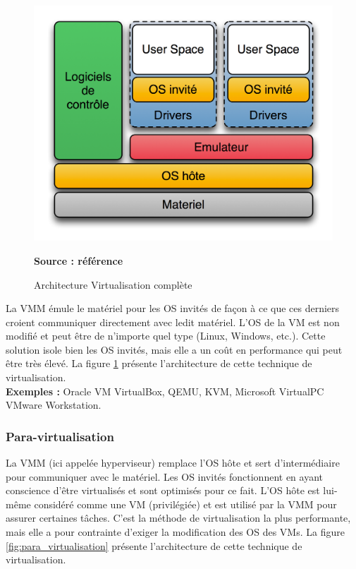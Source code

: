 \begin{figure}[H]
      \centering
      \includegraphics[scale=.8]{fig1/virtualisation_complete.png}
      \caption{Architecture Virtualisation complète}
      \label{fig:virualisation_complete}
      \centering \bfseries Source : référence \cite{online2}
\end{figure}

\noindent La VMM émule le matériel pour les OS invités de façon à ce que ces derniers croient communiquer directement avec ledit matériel. L'OS de la VM est non modifié et peut être de n'importe quel type (Linux, Windows, etc.). Cette solution isole bien les OS invités, mais elle a un coût en performance qui peut être très élevé.  La figure \ref{fig:virualisation_complete} présente l'architecture de cette technique de virtualisation.\\

\noindent \textbf{Exemples :} Oracle VM VirtualBox, QEMU, KVM, Microsoft VirtualPC VMware Workstation.

\subsubsection{Para-virtualisation}
La VMM (ici appelée hyperviseur) remplace l'OS hôte et sert d'intermédiaire pour communiquer avec le matériel. Les OS invités fonctionnent en ayant conscience d'être virtualisés et sont optimisés pour ce fait. L'OS hôte est lui-même considéré comme une VM (privilégiée) et est utilisé par la VMM pour assurer certaines tâches. C'est la méthode de virtualisation la plus performante, mais elle a pour contrainte d'exiger la modification des OS des VMs. La figure \ref{fig:para_virtualisation} présente l'architecture de cette technique de virtualisation.


